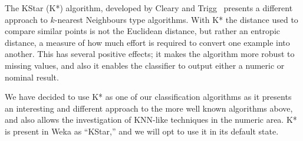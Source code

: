 \documentclass[../thesis/thesis.tex]{subfiles}
\begin{document}
The KStar (K*) algorithm, developed by Cleary and Trigg~\cite{cleary1995k} presents a different approach to $k$-nearest Neighbours type algorithms. With K* the distance used to compare similar points is not the Euclidean distance, but rather an entropic distance, a measure of how much effort is required to convert one example into another. This has several positive effects; it makes the algorithm more robust to missing values, and also it enables the classifier to output either a numeric or nominal result.

We have decided to use K* as one of our classification algorithms as it presents an interesting and different approach to the more well known algorithms above, and also allows the investigation of KNN-like techniques in the numeric area. K* is present in Weka as ``KStar,'' and we will opt to use it in its default state.
\end{document}
